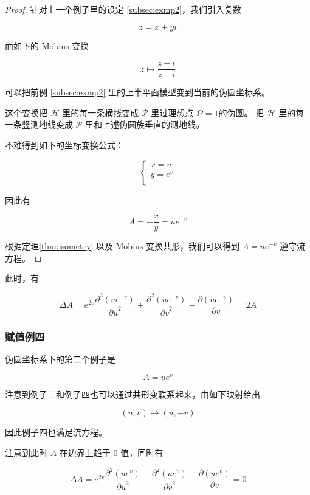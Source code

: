 \documentclass[a4paper,12pt]{article}
\numberwithin{definition}{section}
\numberwithin{lemma}{section}
\numberwithin{proposition}{section}
\numberwithin{theorem}{section}
\numberwithin{grammar}{section}
\numberwithin{program}{section}
\numberwithin{convention}{section}
\numberwithin{corollary}{section}
\begin{document}
\begin{proof}

针对上一个例子里的设定 \ref{subsec:exmp2}，我们引入复数

$$
z = x + y i
$$

而如下的 Möbius 变换

$$
z \mapsto \frac{z-i}{z+i}
$$

可以把前例 \ref{subsec:exmp2} 里的上半平面模型变到当前的伪圆坐标系。

这个变换把 $\mathcal{H}$ 里的每一条横线变成 $\mathcal{P}$ 里过理想点 $\Omega = 1$的伪圆。
把 $\mathcal{H}$ 里的每一条竖测地线变成 $\mathcal{P}$ 里和上述伪圆族垂直的测地线。

不难得到如下的坐标变换公式：

\begin{equation}
\begin{cases}
x = u\\
y = e^v \\
\end{cases}
\label{eq:transform}
\end{equation}

因此有

$$
A = -\frac{x}{y} = u e^{-v}
$$

根据定理\ref{thm:isometry} 以及 Möbius 变换共形，我们可以得到 $A = u e^{-v}$ 遵守流方程。

\end{proof}

此时，有

$$
\Delta A = e^{2v} \frac{\partial^2(u e^{-v})}{{\partial u}^2} + \frac{\partial^2(u e^{-v})}{{\partial v}^2} - \frac{\partial(u e^{-v})}{\partial v} = 2A
$$

\subsubsection{赋值例四}\label{subsec:exmp4}

伪圆坐标系下的第二个例子是

\begin{equation}
A = u e^v
\end{equation}

注意到例子三和例子四也可以通过共形变联系起来，由如下映射给出

$$
(u, v) \mapsto (u, -v)
$$

因此例子四也满足流方程。

注意到此时 $A$ 在边界上趋于 $0$ 值，同时有

$$
\Delta A = e^{2v} \frac{\partial^2(u e^v)}{{\partial u}^2} + \frac{\partial^2(u e^v)}{{\partial v}^2} - \frac{\partial(u e^v)}{\partial v} = 0
$$
\end{document}
